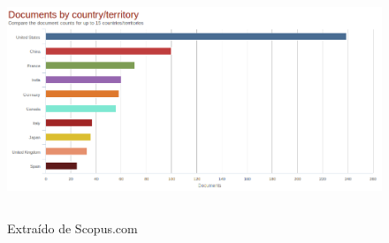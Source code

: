 \begin{figure}[h]
 \centering
  \includegraphics[height=7cm,keepaspectratio=true,clip=true]{imagenes/Logos/scopus2.png}
  \caption{Extraído de Scopus.com}
	\label{Fig: scopus2}
\end{figure}


